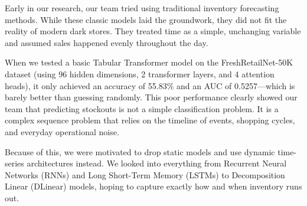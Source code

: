 Early in our research, our team tried using traditional inventory forecasting methods. While these classic models laid the groundwork, they did not fit the reality of modern dark stores. They treated time as a simple, unchanging variable and assumed sales happened evenly throughout the day.

When we tested a basic Tabular Transformer model on the FreshRetailNet-50K dataset (using 96 hidden dimensions, 2 transformer layers, and 4 attention heads), it only achieved an accuracy of 55.83\% and an AUC of 0.5257—which is barely better than guessing randomly. This poor performance clearly showed our team that predicting stockouts is not a simple classification problem. It is a complex sequence problem that relies on the timeline of events, shopping cycles, and everyday operational noise.

Because of this, we were motivated to drop static models and use dynamic time-series architectures instead. We looked into everything from Recurrent Neural Networks (RNNs) and Long Short-Term Memory (LSTMs) to Decomposition Linear (DLinear) models, hoping to capture exactly how and when inventory runs out.
